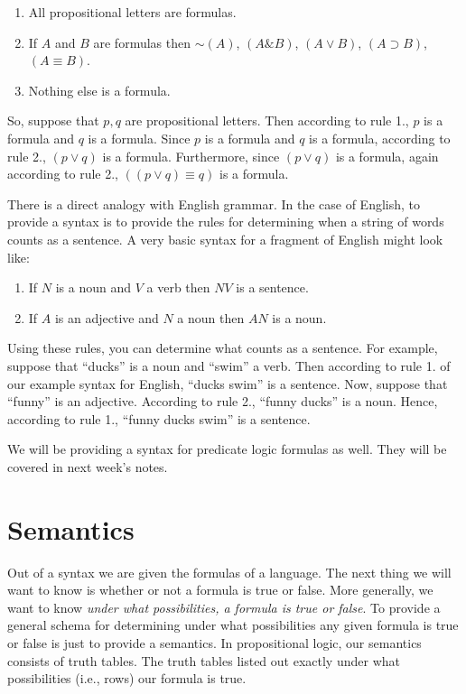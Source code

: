 \documentclass[
]{book}
\providecommand{\tightlist}{%
  \setlength{\itemsep}{0pt}\setlength{\parskip}{0pt}}
\begin{document}
\begin{enumerate}
\def\labelenumi{\arabic{enumi}.}
\tightlist
\item
  All propositional letters are formulas.
\item
  If \(A\) and \(B\) are formulas then \(\sim(A)\), \((A \& B)\), \((A \lor B)\), \((A \supset B)\), \((A \equiv B)\).
\item
  Nothing else is a formula.
\end{enumerate}

So, suppose that \(p,q\) are propositional letters. Then according to rule 1., \(p\) is a formula and \(q\) is a formula. Since \(p\) is a formula and \(q\) is a formula, according to rule 2., \((p \lor q)\) is a formula. Furthermore, since \((p \lor q)\) is a formula, again according to rule 2., \(((p \lor q ) \equiv q)\) is a formula.

There is a direct analogy with English grammar. In the case of English, to provide a syntax is to provide the rules for determining when a string of words counts as a sentence. A very basic syntax for a fragment of English might look like:

\begin{enumerate}
\def\labelenumi{\arabic{enumi}.}
\tightlist
\item
  If \(N\) is a noun and \(V\) a verb then \(N V\) is a sentence.
\item
  If \(A\) is an adjective and \(N\) a noun then \(A N\) is a noun.
\end{enumerate}

Using these rules, you can determine what counts as a sentence. For example, suppose that ``ducks'' is a noun and ``swim'' a verb. Then according to rule 1. of our example syntax for English, ``ducks swim'' is a sentence. Now, suppose that ``funny'' is an adjective. According to rule 2., ``funny ducks'' is a noun. Hence, according to rule 1., ``funny ducks swim'' is a sentence.

We will be providing a syntax for predicate logic formulas as well. They will be covered in next week's notes.

\hypertarget{semantics}{%
\section{Semantics}\label{semantics}}

Out of a syntax we are given the formulas of a language. The next thing we will want to know is whether or not a formula is true or false. More generally, we want to know \emph{under what possibilities, a formula is true or false}. To provide a general schema for determining under what possibilities any given formula is true or false is just to provide a semantics. In propositional logic, our semantics consists of truth tables. The truth tables listed out exactly under what possibilities (i.e., rows) our formula is true.
\end{document}
